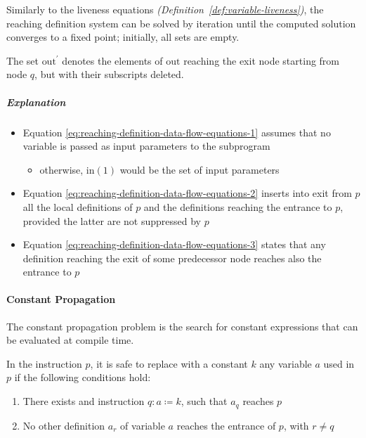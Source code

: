 \documentclass[english]{article}
\begin{document}
Similarly to the liveness equations \textit{(Definition~\ref{def:variable-liveness})}, the reaching definition system can be solved by iteration until the computed solution converges to a fixed point;
initially, all sets are empty.

\bigskip
The set \(\text{out}^\prime\) denotes the elements of \(\text{out}\) reaching the exit node starting from node \(q\), but with their subscripts deleted.

\subparagraph*{Explanation}

\begin{itemize}
  \item Equation \ref{eq:reaching-definition-data-flow-equations-1} assumes that no variable is passed as input parameters to the subprogram
        \begin{itemize}[label=\(\rightarrow\)]
          \item otherwise, \(\text{in}(1)\) would be the set of input parameters
        \end{itemize}
  \item Equation \ref{eq:reaching-definition-data-flow-equations-2} inserts into exit from \(p\) all the local definitions of \(p\) and the definitions reaching the entrance to \(p\), provided the latter are not suppressed by \(p\)
  \item Equation \ref{eq:reaching-definition-data-flow-equations-3} states that any definition reaching the exit of some predecessor node reaches also the entrance to \(p\)
\end{itemize}

\paragraph{Constant Propagation}
\label{par:constant-propagation}

The constant propagation problem is the search for constant expressions that can be evaluated at compile time.

\begin{definition}
  \label{def:constant-propagation}
  In the instruction \(p\), it is safe to replace with a constant \(k\) any variable \(a\) used in \(p\) if the following conditions hold:

  \begin{enumerate}
    \item There exists and instruction \(q : a \coloneqq k\), such that \(a_q\) reaches \(p\)
    \item No other definition \(a_r\) of variable \(a\) reaches the entrance of \(p\), with \(r \neq q\)
  \end{enumerate}
\end{definition}
\end{document}
